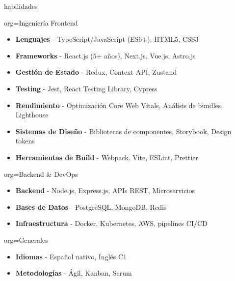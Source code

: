 \documentclass{resume}
\begin{document}
\makeheader

\begin{ResumeSection}{habilidades}
    \newcommand{\skill}[2]{\textbf{#1} - #2}
    \begin{ResumeSubsection}{org=Ingeniería Frontend}
        \begin{itemize}
            \item \skill{Lenguajes}{TypeScript/JavaScript (ES6+), HTML5, CSS3}
            \item \skill{Frameworks}{React.js (5+ años), Next.js, Vue.js, Astro.js}
            \item \skill{Gestión de Estado}{Redux, Context API, Zustand}
            \item \skill{Testing}{Jest, React Testing Library, Cypress}
            \item \skill{Rendimiento}{Optimización Core Web Vitals, Análisis de bundles, Lighthouse}
            \item \skill{Sistemas de Diseño}{Bibliotecas de componentes, Storybook, Design tokens}
            \item \skill{Herramientas de Build}{Webpack, Vite, ESLint, Prettier}
        \end{itemize}
    \end{ResumeSubsection}
    \begin{ResumeSubsection}{org=Backend \& DevOps}
        \begin{itemize}
            \item \skill{Backend}{Node.js, Express.js, APIs REST, Microservicios}
            \item \skill{Bases de Datos}{PostgreSQL, MongoDB, Redis}
            \item \skill{Infraestructura}{Docker, Kubernetes, AWS, pipelines CI/CD}
        \end{itemize}
    \end{ResumeSubsection}
    \begin{ResumeSubsection}{org=Generales}
        \begin{itemize}
            \item \skill{Idiomas}{Español nativo, Inglés C1}
            \item \skill{Metodologías}{Ágil, Kanban, Scrum}
        \end{itemize}
    \end{ResumeSubsection}
\end{ResumeSection}
\end{document}
